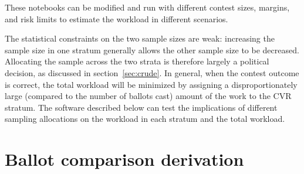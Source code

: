 \documentclass[runningheads]{llncs}
\begin{document}
These notebooks can be modified and run with different contest sizes, margins, and risk limits to
estimate the workload in different scenarios.

The statistical constraints on the two sample sizes are weak: increasing the
sample size in one stratum generally allows the other sample size to be decreased.
Allocating the sample across the two strata is therefore largely a political decision,
as discussed in section~\ref{sec:crude}.
In general, when the contest outcome is correct, the total workload will be minimized by 
assigning a disproportionately large (compared to the number of ballots cast) amount of 
the work to the CVR stratum.
The software described below can test the implications of different sampling allocations
on the workload in each stratum and the total workload.



\appendix
\section{Ballot comparison derivation}\label{sec:appendix-comparison}
\end{document}

